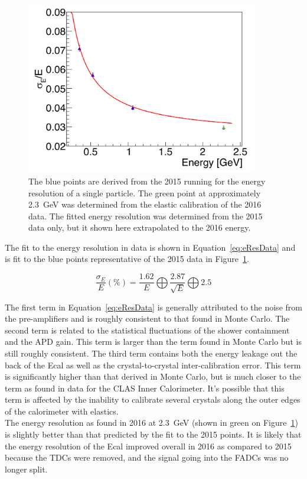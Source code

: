 \begin{figure}[H]
  \centering
      \includegraphics[width=0.9\textwidth]{pics/performance/eResData.png}
  \caption[Energy resolution of the Ecal found in data]{The blue points are derived from the 2015 running for the energy resolution of a single particle. The green point at approximately 2.3~GeV was determined from the elastic calibration of the 2016 data. The fitted energy resolution was determined from the 2015 data only, but it shown here extrapolated to the 2016 energy.}
  \label{Figure:eResData}
\end{figure}

The fit to the energy resolution in data is shown in Equation~\eqref{eq:eResData} and is fit to the blue points representative of the 2015 data in Figure~\ref{Figure:eResData}.

\begin{equation}
	\label{eq:eResData}
	\dfrac{\sigma_E}{E}(\%) = \dfrac{1.62}{E}\bigoplus\dfrac{2.87}{\sqrt{E}}\bigoplus2.5
\end{equation}

The first term in Equation~\eqref{eq:eResData} is generally attributed to the noise from the pre-amplifiers and is roughly consistent to that found in Monte Carlo. The second term is related to the statistical fluctuations of the shower containment and the APD gain. This term is larger than the term found in Monte Carlo but is still roughly consistent. The third term contains both the energy leakage out the back of the Ecal as well as the crystal-to-crystal inter-calibration error. This term is significantly higher than that derived in Monte Carlo, but is much closer to the term as found in data for the CLAS Inner Calorimeter. It's possible that this term is affected by the inability to calibrate several crystals along the outer edges of the calorimeter with elastics. \\
\indent The energy resolution as found in 2016 at 2.3~GeV (shown in green on Figure~\ref{Figure:eResData}) is slightly better than that predicted by the fit to the 2015 points. It is likely that the energy resolution of the Ecal improved overall in 2016 as compared to 2015 because the TDCs were removed, and the signal going into the FADCs was no longer split. 
